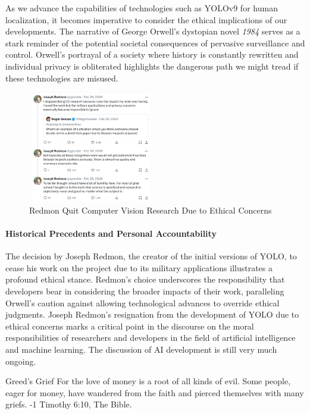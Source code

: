 As we advance the capabilities of technologies such as YOLOv9 for human localization, it becomes imperative to consider the ethical implications of our developments. The narrative of George Orwell's dystopian novel \textit{1984} serves as a stark reminder of the potential societal consequences of pervasive surveillance and control. Orwell's portrayal of a society where history is constantly rewritten and individual privacy is obliterated highlights the dangerous path we might tread if these technologies are misused.


\begin{figure}
    \centering
    \includegraphics[width=0.48\textwidth]{Images/Ethical/redmon-twutter-stoppedCV.png}
    \caption{Redmon Quit Computer Vision Research Due to Ethical Concerns}
    \label{fig:redmon-twitter-stoppedCV}
\end{figure}

\paragraph{Historical Precedents and Personal Accountability}
The decision by Joseph Redmon, the creator of the initial versions of YOLO, to cease his work on the project due to its military applications illustrates a profound ethical stance. Redmon's choice underscores the responsibility that developers bear in considering the broader impacts of their work, paralleling Orwell’s caution against allowing technological advances to override ethical judgments. Joseph Redmon's resignation from the development of YOLO due to ethical concerns marks a critical point in the discourse on the moral responsibilities of researchers and developers in the field of artificial intelligence and machine learning. The discussion of AI development is still very much ongoing.

\begin{myquote}{Greed's Grief}
    For the love of money is a root of all kinds of evil. Some people, eager for money, have wandered from the faith and pierced themselves with many griefs. -1 Timothy 6:10, The Bible.
\end{myquote}

